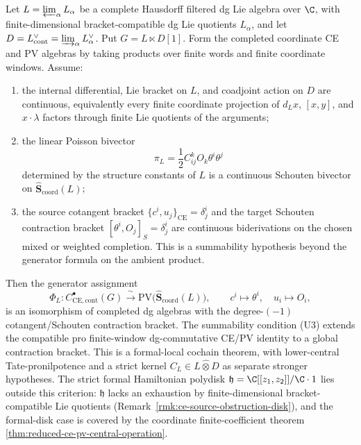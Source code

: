 \documentclass[11pt]{memoir}
\begin{document}
\begin{thm}\label{thm:universal-formal-local-ce-pv-recognition}
  Let \(L=\varprojlim_\alpha L_\alpha\) be a complete Hausdorff filtered
  dg Lie algebra over \(\C\), with finite-dimensional bracket-compatible
  dg Lie quotients \(L_\alpha\), and let
  \(D=L^\vee_{\mathrm{cont}}=\varinjlim_\alpha L_\alpha^\vee\).  Put
  \(G=L\ltimes D[1]\).  Form the completed coordinate CE and PV
  algebras by taking products over finite words and finite coordinate
  windows.  Assume:
  \begin{enumerate}[label=(U\arabic*)]
    \item the internal differential, Lie bracket on \(L\), and
      coadjoint action on \(D\) are continuous, equivalently every
      finite coordinate projection of \(d_Lx\), \([x,y]\), and
      \(x\cdot\lambda\) factors through finite Lie quotients of the
      arguments;
    \item the linear Poisson bivector
      \[
        \pi_L=\frac12 C^k_{ij}O_k\theta^i\theta^j
      \]
      determined by the structure constants of \(L\) is a continuous
      Schouten bivector on
      \(\widehat{\mathbf S}_{\mathrm{coord}}(L)\);
    \item the source cotangent bracket
      \(\{c^i,u_j\}_{\mathrm{CE}}=\delta^i_j\) and the target Schouten
      contraction bracket \([\theta^i,O_j]_S=\delta^i_j\) are continuous
      biderivations on the chosen mixed or weighted completion.  This is
      a summability hypothesis beyond the generator formula on the
      ambient product.
  \end{enumerate}
  Then the generator assignment
  \[
    \Phi_L\colon
    C^\bullet_{\mathrm{CE},\mathrm{cont}}(G)
    \xrightarrow{\ \sim\ }
    \mathrm{PV}\bigl(\widehat{\mathbf S}_{\mathrm{coord}}(L)\bigr),
    \qquad
    c^i\mapsto\theta^i,\quad u_i\mapsto O_i,
  \]
  is an isomorphism of completed dg algebras with the
  degree-\((-1)\) cotangent/Schouten contraction bracket.  The
  summability condition (U3) extends the compatible pro finite-window
  dg-commutative CE/PV identity to a global contraction bracket.  This is
  a formal-local cochain theorem, with lower-central
  Tate-pronilpotence and a strict kernel
  \(C_L\in L\widehat\otimes D\) as separate stronger hypotheses.  The
  strict formal Hamiltonian polydisk
  \(\mathfrak h=\C[[z_1,z_2]]/\C\cdot1\) lies outside this criterion:
  \(\mathfrak h\) lacks an exhaustion by finite-dimensional
  bracket-compatible Lie quotients
  (Remark~\ref{rmk:ce-source-obstruction-disk}), and the formal-disk
  case is covered by the coordinate finite-coefficient theorem
  \ref{thm:reduced-ce-pv-central-operation}.
\end{thm}
\end{document}
